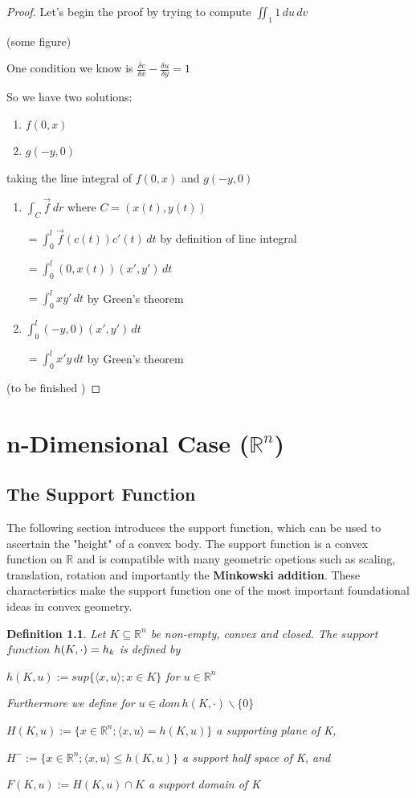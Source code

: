 \documentclass[a4paper]{book}
\newtheorem{definition}{Definition}%
\begin{document}
\begin{proof}
	Let's begin the proof by trying to compute $\iint_{1} 1 \,du\,dv$

	(some figure)

	One condition we know is $\frac{\delta v}{\delta x}-\frac{\delta u}{\delta y}=1$
	
	So we have two solutions:
	\begin{enumerate}
		\item $f(0,x)$
		\item $g(-y,0)$
	\end{enumerate}
	
	taking the line integral of $f(0,x)$ and $g(-y,0)$
	\begin{enumerate}
		\item
			$\int_{C} \overrightarrow{f} \,dr$ \;\;\;where\; $C=(x(t),y(t))$
				
			$= \int_{0}^{l} \overrightarrow{f}(c(t))c'(t) \,dt$ \;\;\;by definition of line integral

			$= \int_{0}^{l} (0,x(t))(x',y') \,dt$
			
			$= \int_{0}^{l} xy' \,dt$ \;\;\;by Green's theorem
		\item
			$\int_{0}^{l} (-y,0)(x',y') \,dt$
			
			$= \int_{0}^{l} x'y \,dt$ \;\;\;by Green's theorem
	\end{enumerate}
	
	(to be finished )
\end{proof}

\chapter{n-Dimensional Case ($\mathbb{R}^n$)}
\section{The Support Function}
The following section introduces the support function, which can be used to ascertain the "height" of a convex body. The support function is a convex function on $\mathbb{R}$ and is compatible with many geometric opetions such as scaling, translation, rotation and importantly the \textbf{Minkowski addition}. These characteristics make the support function one of the most important foundational ideas in convex geometry.

\begin{definition}
	Let $K\subseteq\mathbb{R}^n$ be non-empty, convex and closed. The $support$ $function$ $h(K,\cdot\space)=h_k$ is defined by
	\begin{center}
		$h(K,u):=sup\{\langle x,u\rangle;x\in K\}$ for $u\in\mathbb{R}^n$
	\end{center}
	Furthermore we define for $u\in dom\,h(K,\cdot)\backslash\{0\}$
	\begin{center}
		$H(K,u):=\{x\in\mathbb{R}^n;\langle x,u\rangle=h(K,u)\}$ a supporting plane of K,
		
		$H^{-}:=\{x\in\mathbb{R}^n;\langle x,u\rangle\leq h(K,u)\}$ a support half space of K, and 
		
		$F(K,u):=H(K,u)\cap K$ a support domain of K
	\end{center}
\end{definition}
\end{document}
